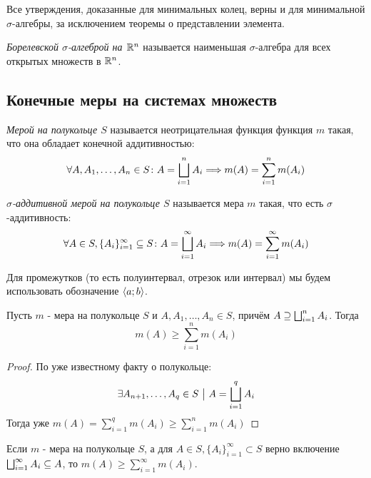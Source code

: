 \begin{note}
	Все утверждения, доказанные для минимальных колец, верны и для минимальной $\sigma$-алгебры, за исключением теоремы о представлении элемента.
\end{note}

\begin{definition}
	\textit{Борелевской $\sigma$-алгеброй на $\mathbb{R}^n$} называется наименьшая $\sigma$-алгебра для всех открытых множеств в $\mathbb{R}^n$.
\end{definition}

\subsection{Конечные меры на системах множеств}

\begin{definition}
	\textit{Мерой на полукольце $S$} называется неотрицательная функция функция $m$ такая, что она обладает конечной аддитивностью:
	\[
		\forall A, A_1, \ldots, A_n \in S \colon A = \bigsqcup_{i = 1}^n A_i \Longrightarrow m(A) = \sum_{i = 1}^n m(A_i)
	\]
\end{definition}

\begin{definition}
	\textit{$\sigma$-аддитивной мерой на полукольце $S$} называется мера $m$ такая, что есть $\sigma$-аддитивность:
	\[
		\forall A \in S, \{A_i\}_{i = 1}^\infty \subseteq S \colon A = \bigsqcup_{i = 1}^\infty A_i \Longrightarrow m(A) = \sum_{i = 1}^\infty m(A_i)
	\]
\end{definition}

\begin{note}
	Для промежутков (то есть полуинтервал, отрезок или интервал) мы будем использовать обозначение $\left\langle a; b\right\rangle$.
\end{note}

\begin{lemma}
	Пусть $m$ - мера на полукольце $S$ и $A, A_1, \ldots, A_n \in S$, причём $A \supseteq \bigsqcup_{i = 1}^n A_i$. Тогда
	\[
		m(A) \ge \sum_{i = 1}^n m(A_i)
	\]
\end{lemma}

\begin{proof}
	По уже известному факту о полукольце:
	\[
		\exists A_{n + 1}, \ldots, A_q \in S \ \big|\  A = \bigsqcup_{i = 1}^q A_i
	\]
	Тогда уже $m(A) = \sum_{i = 1}^q m(A_i) \ge \sum_{i = 1}^n m(A_i)$
\end{proof}

\begin{corollary}
	Если $m$ - мера на полукольце $S$, а для $A \in S, \{A_i\}_{i = 1}^\infty \subset S$ верно включение $\bigsqcup_{i = 1}^\infty A_i \subseteq A$, то $m(A) \ge \sum_{i = 1}^\infty m(A_i)$.
\end{corollary}

